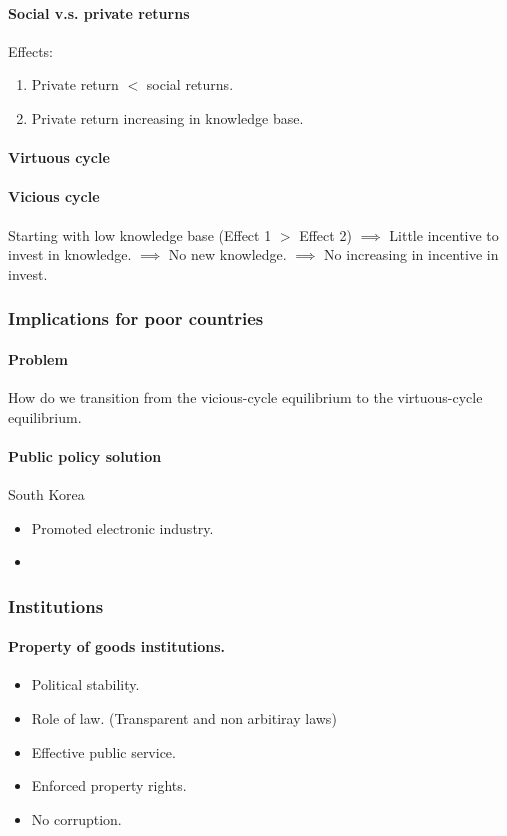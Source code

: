\documentclass[11pt]{article}
\begin{document}
	\paragraph{Social v.s. private returns} Effects:
		\begin{enumerate}
			\item Private return $<$ social returns.
			\item Private return increasing in knowledge base.
		\end{enumerate}
	\paragraph{Virtuous cycle}
	\paragraph{Vicious cycle} Starting with low knowledge base (Effect 1 $>$ Effect 2)
	\newline
	$\implies$ Little incentive to invest in knowledge.
	\newline
	$\implies$ No new knowledge.
	\newline
	$\implies$ No increasing in incentive in invest.
	
	\subsubsection{Implications for poor countries}
	\paragraph{Problem} How do we transition from the vicious-cycle equilibrium to the virtuous-cycle equilibrium.
	\paragraph{Public policy solution} South Korea
		\begin{itemize}
			\item Promoted electronic industry.
			\item 
		\end{itemize}
		
	\subsubsection{Institutions}
	\paragraph{Property of goods institutions.}
	\begin{itemize}
		\item Political stability.
		\item Role of law. (Transparent and non arbitiray laws)
		\item Effective public service.
		\item Enforced property rights.
		\item No corruption.
	\end{itemize}
\end{document}

